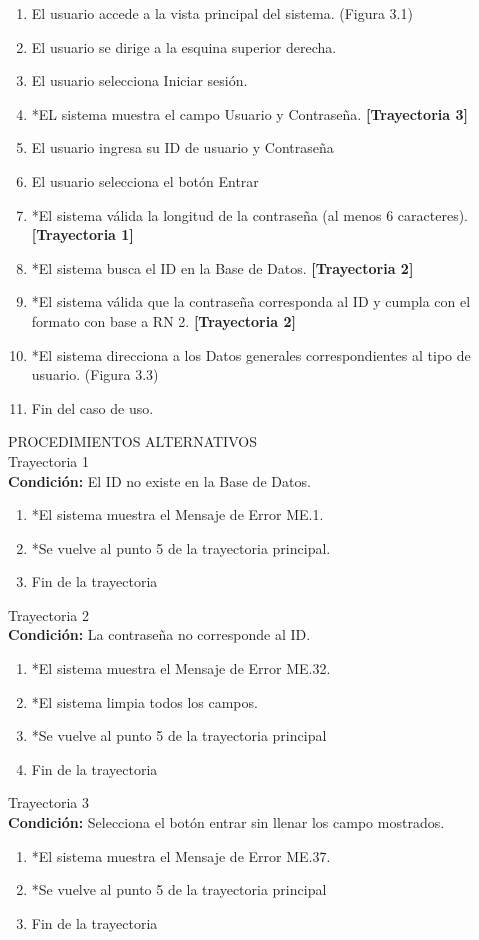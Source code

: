 \begin{enumerate}
    \item El usuario accede a la vista principal del sistema. (Figura 3.1)
	\item El usuario se dirige a la esquina superior derecha.
	\item El usuario selecciona Iniciar sesión.
	\item *EL sistema muestra el campo Usuario y Contraseña. \textbf{[Trayectoria 3]}
	\item El usuario ingresa su ID de usuario y Contraseña
	\item El usuario selecciona el botón Entrar
	\item *El sistema válida la longitud de la contraseña (al menos 6 caracteres). \textbf{[Trayectoria 1]}
	\item *El sistema busca el ID en la Base de Datos. \textbf{[Trayectoria 2]}
	\item *El sistema válida que la contraseña corresponda al ID y cumpla con el formato con base a RN 2. \textbf{[Trayectoria 2]}
	\item *El sistema direcciona a los Datos generales correspondientes al tipo de usuario. (Figura 3.3)
	\item Fin del caso de uso.
\end{enumerate}
\vspace*{1cm}
\Large{PROCEDIMIENTOS ALTERNATIVOS}\\
	\large{Trayectoria 1}\\
	\textbf{Condición:} El ID no existe en la Base de Datos.
	\begin{enumerate}
		\item *El sistema muestra el Mensaje de Error ME.1.
		\item *Se vuelve al punto 5 de la trayectoria principal.
		\item Fin de la trayectoria
	\end{enumerate}
	\large{Trayectoria 2}\\
	\textbf{Condición:} La contraseña no corresponde al ID.
	\begin{enumerate}
		\item *El sistema muestra el Mensaje de Error ME.32.
		\item *El sistema limpia todos los campos.
		\item *Se vuelve al punto 5 de la trayectoria principal
		\item Fin de la trayectoria
	\end{enumerate}
	\large{Trayectoria 3}\\
	\textbf{Condición:} Selecciona el botón entrar sin llenar los campo mostrados.
	\begin{enumerate}
		\item *El sistema muestra el Mensaje de Error ME.37.
		\item *Se vuelve al punto 5 de la trayectoria principal
		\item Fin de la trayectoria
	\end{enumerate}
\newpage